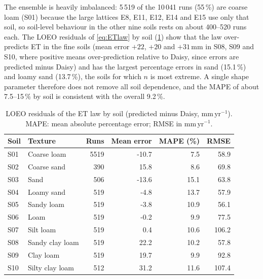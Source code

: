\documentclass[preprint,12pt,authoryear]{elsarticle}
\begin{document}
The ensemble is heavily imbalanced: 5\,519 of the 10\,041 runs (55\,\%) are coarse loam (S01) because the large lattices E8, E11, E12, E14 and E15 use only that soil, so soil-level behaviour in the other nine soils rests on about 400--520 runs each. The LOEO residuals of \cref{eq:ETlaw} by soil (\cref{tab:soilres}) show that the law over-predicts ET in the fine soils (mean error $+22$, $+20$ and $+31$\,mm in S08, S09 and S10, where positive means over-prediction relative to Daisy, since errors are predicted minus Daisy) and has the largest percentage errors in sand (15.1\,\%) and loamy sand (13.7\,\%), the soils for which $n$ is most extreme. A single shape parameter therefore does not remove all soil dependence, and the MAPE of about 7.5--15\,\% by soil is consistent with the overall 9.2\,\%.

\begin{table}[H]\centering\small
\caption{LOEO residuals of the ET law by soil (predicted minus Daisy, mm\,yr$^{-1}$). MAPE: mean absolute percentage error; RMSE in mm\,yr$^{-1}$.}
\label{tab:soilres}
\begin{tabular}{llrrrr}
\toprule
Soil & Texture & Runs & Mean error & MAPE (\%) & RMSE\\\midrule
S01 & Coarse loam & 5519 & -10.7 & 7.5 & 58.9\\
S02 & Coarse sand & 390 & 15.8 & 8.6 & 69.8\\
S03 & Sand & 506 & -13.6 & 15.1 & 63.8\\
S04 & Loamy sand & 519 & -4.8 & 13.7 & 57.9\\
S05 & Sandy loam & 519 & -3.8 & 10.9 & 56.1\\
S06 & Loam & 519 & -0.2 & 9.9 & 77.5\\
S07 & Silt loam & 519 & 0.4 & 10.6 & 106.2\\
S08 & Sandy clay loam & 519 & 22.2 & 10.2 & 57.8\\
S09 & Clay loam & 519 & 19.7 & 9.9 & 92.8\\
S10 & Silty clay loam & 512 & 31.2 & 11.6 & 107.4\\
\bottomrule
\end{tabular}
\end{table}
\end{document}
